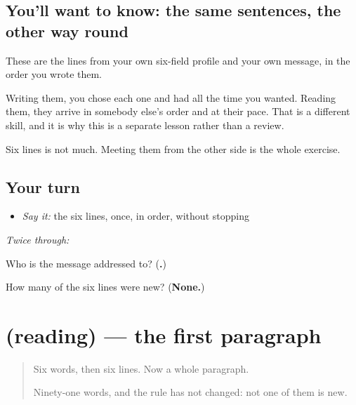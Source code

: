 \subsection*{You'll want to know: the same sentences, the other way round}
These are the lines from your own six-field profile and your own message, in the order you wrote them.

Writing them, you chose each one and had all the time you wanted. Reading them, they arrive in somebody else's order and at their pace. That is a different skill, and it is why this is a separate lesson rather than a review.

Six lines is not much. Meeting them from the other side is the whole exercise.

\subsection*{Your turn}
\begin{itemize}
\raggedright
  \item \emph{Say it:} the six lines, once, in order, without stopping
\end{itemize}

\emph{Twice through:}

\begin{tcolorbox}[breakable,colback=teal!4,colframe=teal!35!black,title={Before you move on}]
Who is the message addressed to? (\textbf{.})

How many of the six lines were new? (\textbf{None.})
\end{tcolorbox}
\section[(reading)]{(reading) — the first paragraph}

\label{lesson:MR-C62-pahila-paath}



\begin{quote}
Six words, then six lines. Now a whole paragraph.

Ninety-one words, and the rule has not changed: not one of them is new.
\end{quote}

